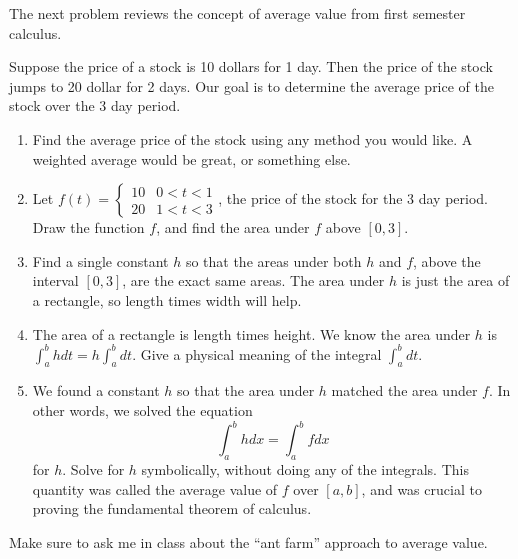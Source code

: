 The next problem reviews the concept of average value from first semester calculus.

\begin{problem}
 Suppose the price of a stock is 10 dollars for 1 day.  Then the price of the stock jumps to 20 dollar for 2 days.  Our goal is to determine the average price of the stock over the 3 day period. 
\begin{enumerate}
 \item Find the average price of the stock using any method you would like. A weighted average would be great, or something else.
 \item Let $f(t) = \begin{cases}10 &0<t<1\\20&1<t<3\end{cases}$, the price of the stock for the 3 day period. Draw the function $f$, and find the area under $f$ above $[0,3]$.
 \item Find a single constant $h$ so that the areas under both $h$ and $f$, above the interval $[0,3]$, are the exact same areas.  The area under $h$ is just the area of a rectangle, so length times width will help. 
 \item The area of a rectangle is length times height.  We know the area under $h$ is $\int_a^b hdt = h \int_a^bdt$. Give a physical meaning of the integral $\int_a^b dt$.  
 \item We found a constant $h$ so that the area under $h$ matched the area under $f$. In other words, we solved the equation $$\int_a^b h dx = \int_a^b f dx$$ for $h$.  Solve for $h$ symbolically, without doing any of the integrals. This quantity was called the average value of $f$ over $[a,b]$, and was crucial to proving the fundamental theorem of calculus.
\end{enumerate}
\end{problem}

%
Make sure to ask me in class about the ``ant farm'' approach to average value. 

